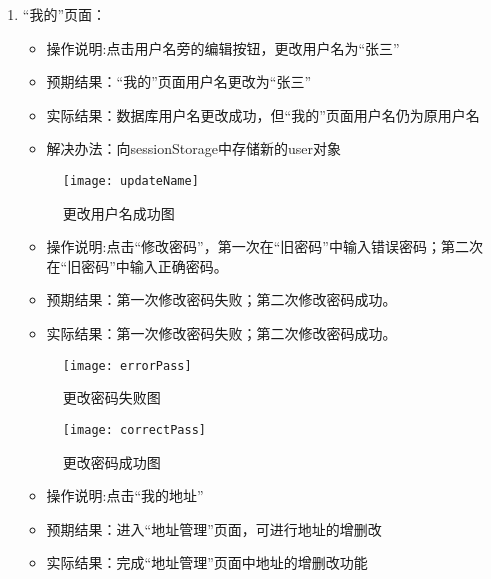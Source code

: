 \begin{enumerate}
    \item {“我的”页面}：
          \begin{itemize}
              \item{操作说明}:点击用户名旁的编辑按钮，更改用户名为“张三”
              \item {预期结果}：“我的”页面用户名更改为“张三”
              \item {实际结果}：数据库用户名更改成功，但“我的”页面用户名仍为原用户名
              \item {解决办法}：向sessionStorage中存储新的user对象
          \end{itemize}
          \begin{figure}[htbp]
              \centering
              \texttt{[image: updateName]}
              \caption{更改用户名成功图}\label{fig:updateName}
          \end{figure}
          \begin{itemize}
              \item{操作说明}:点击“修改密码”，第一次在“旧密码”中输入错误密码；第二次在“旧密码”中输入正确密码。
              \item {预期结果}：第一次修改密码失败；第二次修改密码成功。
              \item {实际结果}：第一次修改密码失败；第二次修改密码成功。
          \end{itemize}
          \begin{figure}[htbp]
              \centering
              \begin{minipage}{0.4\textwidth}
                  \centering
                  \texttt{[image: errorPass]}
                  \caption{更改密码失败图}\label{fig:errorPass}
              \end{minipage}
              \begin{minipage}{0.4\textwidth}
                  \centering
                  \texttt{[image: correctPass]}
                  \caption{更改密码成功图}\label{fig:correctPass}
              \end{minipage}
          \end{figure}
          \begin{itemize}
              \item{操作说明}:点击“我的地址”
              \item {预期结果}：进入“地址管理”页面，可进行地址的增删改
              \item {实际结果}：完成“地址管理”页面中地址的增删改功能

\end{itemize}
\end{enumerate}
